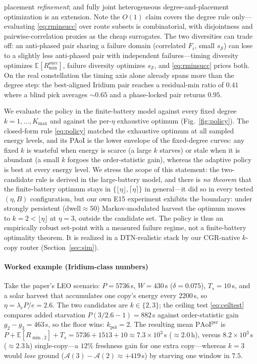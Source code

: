 \documentclass[twocolumn,3p,times,procedia]{elsarticle}
\newcommand{\PAoIper}{\mathrm{PAoI}^{\mathrm{per}}}
\newcommand{\E}{\mathbb{E}}
\begin{document}
placement \emph{refinement}; and fully joint heterogeneous
degree-and-placement optimization is an extension. Note the $O(1)$
claim covers the degree rule only---evaluating \eqref{eq:rminsucc}
over route subsets is combinatorial, with disjointness and
pairwise-correlation proxies as the cheap surrogates. The two
diversities can trade off: an
anti-phased pair sharing a failure domain (correlated $F_i$, small
$s_{\mathcal{S}}$) can lose to a slightly less anti-phased pair with
independent
failures---timing diversity optimizes
$\E[R^{\mathrm{succ}}_{\min}]$,
failure diversity optimizes $s_{\mathcal{S}}$, and \eqref{eq:rminsucc}
prices both.
On the real constellation the timing axis alone already spans more
than the degree step: the best-aligned Iridium pair reaches a
residual-min ratio of
$0.41$ where a blind pick averages ${\sim}0.65$ and a phase-locked pair
returns $0.95$.

We evaluate the policy in the finite-battery model against every fixed
degree $k=1,\dots,K_{\max}$ and against the per-$\eta$ exhaustive optimum
(Fig.~\ref{fig:policy}). The closed-form rule \eqref{eq:policy} matched
the exhaustive optimum at all sampled energy levels, and its PAoI is the
lower envelope of the fixed-degree curves: any fixed $k$ is wasteful when
energy is scarce (a large $k$ starves) or stale when it is abundant (a
small $k$ forgoes the order-statistic gain), whereas the adaptive policy
is best at every energy level. We stress the scope of this statement:
the two-candidate rule is derived in the large-battery model, and there
is \emph{no theorem} that the finite-battery optimum stays in
$\{\lfloor\eta\rfloor,\lceil\eta\rceil\}$ in general---it did so in
every tested $(\eta,B)$ configuration, but our own E15 experiment
exhibits the boundary: under strongly persistent (dwell${\approx}50$)
Markov-modulated harvest the optimum moves to $k{=}2<\lfloor\eta\rfloor$
at $\eta{=}3$, outside the candidate set. The policy is thus an
empirically robust set-point with a measured failure regime, not a
finite-battery optimality theorem. It is realized in a DTN-realistic
stack by our CGR-native $k$-copy router (Section~\ref{sec:sim}).

\paragraph*{Worked example (Iridium-class numbers)}
Take the paper's LEO scenario: $P=5736$\,s, $W=430$\,s
($\delta=0.075$), $T_s=10$\,s, and a solar harvest that accumulates one
copy's energy every $2200$\,s, so $\eta=\lambda_e P/e=2.6$. The two
candidates are $k\in\{2,3\}$; the ceiling test \eqref{eq:ceiltest}
compares added starvation $P(3/2.6-1)=882$\,s against order-statistic
gain $g_2-g_3=463$\,s, so the floor wins: $k_{\mathrm{pol}}=2$. The
resulting mean $\PAoIper$ is $P+\E[R_{\min,2}]+T_s=5736+1513+10\approx
7.3\times10^3$\,s ($\approx 2.0$\,h), versus $8.2\times10^3$\,s
($\approx2.3$\,h) single-copy---a $12\%$ freshness gain for one extra
copy---whereas $k{=}3$ would \emph{lose} ground
($\mathcal{A}(3)-\mathcal{A}(2)\approx+419$\,s) by starving one window in
$7.5$.
\end{document}
